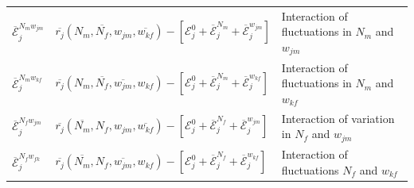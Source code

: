 \documentclass[12pt]{article}
\begin{document}
\begin{table}[h]
{\begin{tabular}{l|l|l}
        $\overline{\mathcal{E}}^{N_{m}w_{jm}}_{j}$ & $\overline{r_{j}}(N_{m}, \overline{N_{f}}, w_{jm}, \overline{w_{kf}})- [\mathcal{E}^{0}_{j} +\overline{\mathcal{E}}^{N_{m}}_j+\overline{\mathcal{E}}^{w_{jm}}_{j}]$  & Interaction of fluctuations in $N_{m}$ and $w_{jm}$ \\


        $\overline{\mathcal{E}}^{N_{m}w_{kf}}_{j}$& $ \overline{r_{j}}(N_{m}, \overline{N_{f}}, \overline{w_{jm}}, w_{kf})- [\mathcal{E}^{0}_{j} +\overline{\mathcal{E}}^{N_{m}}_j+\overline{\mathcal{E}}^{w_{kf}}_{j}]$ & Interaction of fluctuations in $N_{m}$ and $w_{kf}$\\


        $\overline{\mathcal{E}}^{N_{f}w_{jm}}_{j}$& $\overline{r_{j}}(\overline{N_{m}}, N_{f}, w_{jm}, \overline{w_{kf}})- [\mathcal{E}^{0}_{j} +\overline{\mathcal{E}}^{N_{f}}_j+\overline{\mathcal{E}}^{w_{jm}}_{j}]$ & Interaction of variation in $N_{f}$ and $w_{jm}$ \\

        $\overline{\mathcal{E}}^{N_{f}w_{fk}}_{j}$& $ \overline{r_{j}}(\overline{N_{m}}, N_{f}, \overline{w_{jm}}, w_{kf})- [\mathcal{E}^{0}_{j} +\overline{\mathcal{E}}^{N_{f}}_j+\overline{\mathcal{E}}^{w_{kf}}_{j}]$ & Interaction of fluctuations $N_{f}$ and $w_{kf}$ \\








\end{tabular}}
\end{table}
\end{document}
